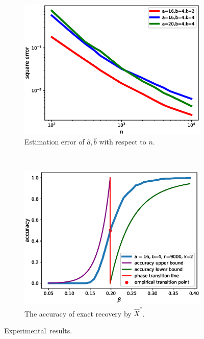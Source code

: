 \documentclass[entropy,article,accept,moreauthors,pdftex]{Definitions/mdpi}
\newcommand{\1}{\mathbbm{1}}
\begin{document}
\begin{figure}[H]
\widefigure
\begin{subfigure}{0.5\textwidth}
	\includegraphics[width=\textwidth]{estimator-error-2020-12-20.eps}
	\caption{Estimation error of $\hat{a}, \hat{b}$ with respect to $n$.}\label{fig:estimator}
\end{subfigure}~
\begin{subfigure}{0.5\textwidth}
	\includegraphics[width=\textwidth]{beta_trans-2020-11-28.eps}
	\caption{The accuracy of exact recovery by $\hat{X}^*$.}\label{fig:erh}
\end{subfigure}
\caption{Experimental~results.}\label{fig2}
\end{figure}
\end{document}
